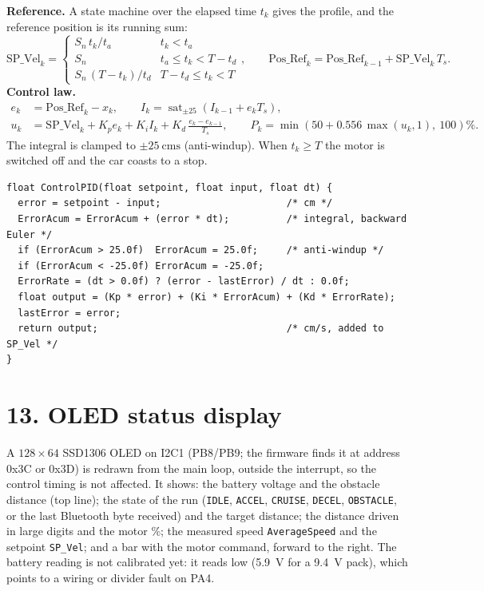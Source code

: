 \documentclass[letterpaper, 11pt]{article}
\begin{document}
\textbf{Reference.} A state machine over the elapsed time $t_k$ gives the
profile, and the reference position is its running sum:
\[
  \text{SP\_Vel}_k =
  \begin{cases}
    S_n\,t_k/t_a & t_k < t_a\\
    S_n & t_a \le t_k < T - t_d\\
    S_n\,(T - t_k)/t_d & T - t_d \le t_k < T
  \end{cases},
  \qquad
  \text{Pos\_Ref}_k = \text{Pos\_Ref}_{k-1} + \text{SP\_Vel}_k\,T_s .
\]
\textbf{Control law.}
\begin{align*}
  e_k &= \text{Pos\_Ref}_k - x_k, \qquad
  I_k = \operatorname{sat}_{\pm 25}\!\left(I_{k-1} + e_k T_s\right),\\
  u_k &= \text{SP\_Vel}_k + K_p e_k + K_i I_k + K_d\,\frac{e_k - e_{k-1}}{T_s},
  \qquad P_k = \min\!\left(50 + 0.556\,\max(u_k, 1),\ 100\right)\%.
\end{align*}
The integral is clamped to $\pm\SI{25}{\centi\meter\second}$ (anti-windup). When
$t_k \ge T$ the motor is switched off and the car coasts to a stop.

\begin{lstlisting}[caption={The PID, \texttt{ControlPID()} in \texttt{car\_drive.c}.}]
float ControlPID(float setpoint, float input, float dt) {
  error = setpoint - input;                      /* cm */
  ErrorAcum = ErrorAcum + (error * dt);          /* integral, backward Euler */
  if (ErrorAcum > 25.0f)  ErrorAcum = 25.0f;     /* anti-windup */
  if (ErrorAcum < -25.0f) ErrorAcum = -25.0f;
  ErrorRate = (dt > 0.0f) ? (error - lastError) / dt : 0.0f;
  float output = (Kp * error) + (Ki * ErrorAcum) + (Kd * ErrorRate);
  lastError = error;
  return output;                                 /* cm/s, added to SP_Vel */
}
\end{lstlisting}

\section*{13. OLED status display}

A $128\times64$ SSD1306 OLED on I2C1 (PB8/PB9; the firmware finds it at address 0x3C or 0x3D) is redrawn from the
main loop, outside the interrupt, so the control timing is not affected. It shows:
the battery voltage and the obstacle distance (top line); the state of the run
(\texttt{IDLE}, \texttt{ACCEL}, \texttt{CRUISE}, \texttt{DECEL}, \texttt{OBSTACLE},
or the last Bluetooth byte received) and the target distance; the distance driven in
large digits and the motor \%; the measured speed \texttt{AverageSpeed} and the
setpoint \texttt{SP\_Vel}; and a bar with the motor command, forward to the right.
The battery reading is not calibrated yet: it reads low (\SI{5.9}{\volt} for a
\SI{9.4}{\volt} pack), which points to a wiring or divider fault on PA4.
\end{document}
